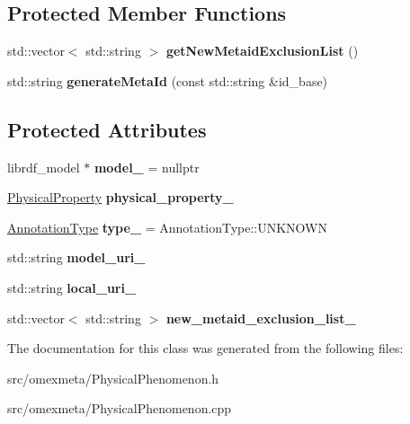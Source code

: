 \subsection*{Protected Member Functions}
\begin{DoxyCompactItemize}
\item 
\mbox{\label{classomexmeta_1_1PhysicalPhenomenon_a54d90cf6db78e98bd091f478dc5bd74a}} 
std\+::vector$<$ std\+::string $>$ {\bfseries get\+New\+Metaid\+Exclusion\+List} ()
\item 
\mbox{\label{classomexmeta_1_1PhysicalPhenomenon_afe71a5c6399b992922eb6eeda6de49bd}} 
std\+::string {\bfseries generate\+Meta\+Id} (const std\+::string \&id\+\_\+base)
\end{DoxyCompactItemize}
\subsection*{Protected Attributes}
\begin{DoxyCompactItemize}
\item 
\mbox{\label{classomexmeta_1_1PhysicalPhenomenon_a9de43fc3fd94d3463c7fb9b8f684e78b}} 
librdf\+\_\+model $\ast$ {\bfseries model\+\_\+} = nullptr
\item 
\mbox{\label{classomexmeta_1_1PhysicalPhenomenon_a9e17807d60d9e3f797d6c02ef85cdfc6}} 
\hyperlink{classomexmeta_1_1PhysicalProperty}{Physical\+Property} {\bfseries physical\+\_\+property\+\_\+}
\item 
\mbox{\label{classomexmeta_1_1PhysicalPhenomenon_a74e88adb2099099e411b55cb9aa460a0}} 
\hyperlink{namespaceomexmeta_a1129ebb8a92218ebb27b9c76ac8462f7}{Annotation\+Type} {\bfseries type\+\_\+} = Annotation\+Type\+::\+U\+N\+K\+N\+O\+WN
\item 
\mbox{\label{classomexmeta_1_1PhysicalPhenomenon_a696cbc4f6490dd55d6bd41c7711cd0ec}} 
std\+::string {\bfseries model\+\_\+uri\+\_\+}
\item 
\mbox{\label{classomexmeta_1_1PhysicalPhenomenon_a114864dfae1f79ce4e3f430b7711516c}} 
std\+::string {\bfseries local\+\_\+uri\+\_\+}
\item 
\mbox{\label{classomexmeta_1_1PhysicalPhenomenon_a710756d611350395539dfa9f7fbf764e}} 
std\+::vector$<$ std\+::string $>$ {\bfseries new\+\_\+metaid\+\_\+exclusion\+\_\+list\+\_\+}
\end{DoxyCompactItemize}


The documentation for this class was generated from the following files\+:\begin{DoxyCompactItemize}
\item 
src/omexmeta/Physical\+Phenomenon.\+h\item 
src/omexmeta/Physical\+Phenomenon.\+cpp\end{DoxyCompactItemize}
